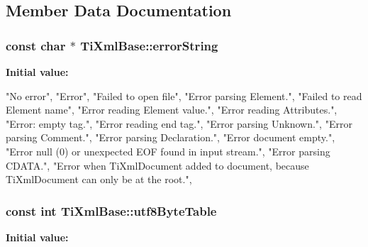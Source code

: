 \subsection{\-Member \-Data \-Documentation}
\hypertarget{classTiXmlBase_a7ac8feec4100e446b3d78e1ac0659700}{
\subsubsection[{error\-String}]{\setlength{\rightskip}{0pt plus 5cm}const char $\ast$ \-Ti\-Xml\-Base\-::error\-String}}\label{classTiXmlBase_a7ac8feec4100e446b3d78e1ac0659700}
{\bfseries \-Initial value\-:}
\begin{DoxyCode}

{
    "No error",
    "Error",
    "Failed to open file",
    "Error parsing Element.",
    "Failed to read Element name",
    "Error reading Element value.",
    "Error reading Attributes.",
    "Error: empty tag.",
    "Error reading end tag.",
    "Error parsing Unknown.",
    "Error parsing Comment.",
    "Error parsing Declaration.",
    "Error document empty.",
    "Error null (0) or unexpected EOF found in input stream.",
    "Error parsing CDATA.",
    "Error when TiXmlDocument added to document, because TiXmlDocument can only
       be at the root.",
}
\end{DoxyCode}
\hypertarget{classTiXmlBase_ac8c86058137bdb4b413c3eca58f2d467}{
\subsubsection[{utf8\-Byte\-Table}]{\setlength{\rightskip}{0pt plus 5cm}const int \-Ti\-Xml\-Base\-::utf8\-Byte\-Table}}\label{classTiXmlBase_ac8c86058137bdb4b413c3eca58f2d467}
{\bfseries \-Initial value\-:}
